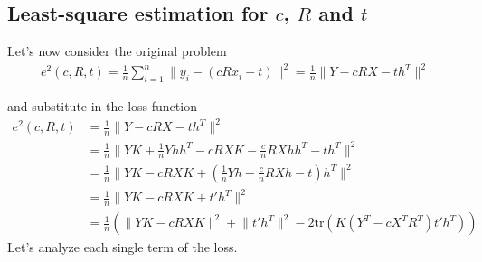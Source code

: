 \documentclass{report}
\begin{document}
\subsection{Least-square estimation for $c$, $R$ and $t$}
Let's now consider the original problem
\begin{align}
    e^2(c, R, t) = \frac{1}{n}\sum_{i=1}^{n}\lVert y_i - (cRx_i+t) \rVert^2 = \frac{1}{n} \lVert Y - cRX - th^T \rVert^2
\end{align}

and substitute in the loss function
\begin{align}
    e^2(c, R, t) &= \frac{1}{n} \lVert Y - cRX - th^T \rVert^2 \\
    &= \frac{1}{n} \lVert YK + \frac{1}{n}Yhh^T - cRXK - \frac{c}{n}RXhh^T - th^T \rVert^2 \\
    &= \frac{1}{n} \lVert YK - cRXK + \left(\frac{1}{n}Yh - \frac{c}{n}RXh - t\right)h^T \rVert^2 \\
    &= \frac{1}{n} \lVert YK - cRXK + t'h^T \rVert^2 \\
    &= \frac{1}{n} \left( \lVert YK - cRXK \rVert^2 + \lVert t'h^T \rVert^2 - 2\text{tr}(K(Y^T - cX^TR^T)t'h^T) \right)
\end{align}
Let's analyze each single term of the loss.
\end{document}
